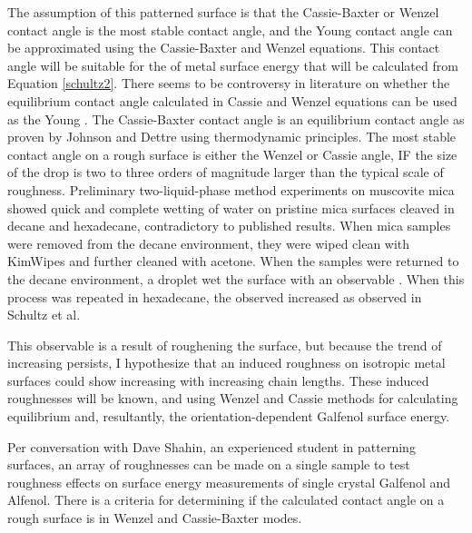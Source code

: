 \begin{outline}[enumerate]
	\2 The assumption of this patterned surface is that the Cassie-Baxter or Wenzel contact angle is the most stable contact angle, and the Young contact angle can be approximated using the Cassie-Baxter and Wenzel equations. This contact angle will be suitable for the of metal surface energy that will be calculated from Equation \ref{schultz2}.
		\3 There seems to be controversy in literature on whether the equilibrium contact angle calculated in Cassie and Wenzel equations can be used as the Young \ca.\cite{Attension2015,Marmur2009b,Bracco2013}
		\3 The Cassie-Baxter contact angle is an equilibrium contact angle as proven by Johnson and Dettre using thermodynamic principles.\cite{Johnson1964}
		\3 The most stable contact angle on a rough surface is either the Wenzel or Cassie angle, IF the size of the drop is two to three orders of magnitude larger than the typical scale of roughness.\cite{Meiron2004} %
	\2 Preliminary two-liquid-phase method experiments on muscovite mica showed quick and complete wetting of water on pristine mica surfaces cleaved in decane and hexadecane, contradictory to published results.\cite{Schultz1992} When mica samples were removed from the decane environment, they were wiped clean with KimWipes and further cleaned with acetone. When the samples were returned to the decane environment, a droplet wet the surface with an observable \ca. When this process was repeated in hexadecane, the observed \ca increased as observed in Schultz et al.\cite{Schultz1992} 
	
	This observable \ca is a result of roughening the surface, but because the trend of increasing \ca persists, I hypothesize that an induced roughness on isotropic metal surfaces could show increasing \ca[s] with increasing \nalk chain lengths. These induced roughnesses will be known, and using Wenzel\cite{Wenzel1936,Wenzel1949a} and Cassie\cite{Cassie1944} methods for calculating equilibrium \ca[s] and, resultantly, the orientation-dependent Galfenol surface energy. 
		
	\2 Per conversation with Dave Shahin, an experienced student in patterning surfaces, an array of roughnesses can be made on a single sample to test roughness effects on surface energy measurements of single crystal Galfenol and Alfenol. 
		\3 There is a criteria for determining if the calculated contact angle on a rough surface is in Wenzel and Cassie-Baxter modes. 
	

\end{outline}
